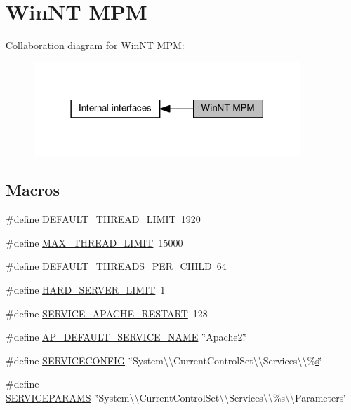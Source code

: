 \hypertarget{group__APACHE__MPM__WINNT}{}\section{Win\+NT M\+PM}
\label{group__APACHE__MPM__WINNT}
Collaboration diagram for Win\+NT M\+PM\+:
\nopagebreak
\begin{figure}[H]
\begin{center}
\leavevmode
\includegraphics[width=285pt]{group__APACHE__MPM__WINNT}
\end{center}
\end{figure}
\subsection*{Macros}
\begin{DoxyCompactItemize}
\item 
\#define \hyperlink{group__APACHE__MPM__WINNT_ga62328ee393d1f137bcb50e99ce25071d}{D\+E\+F\+A\+U\+L\+T\+\_\+\+T\+H\+R\+E\+A\+D\+\_\+\+L\+I\+M\+IT}~1920
\item 
\#define \hyperlink{group__APACHE__MPM__WINNT_ga99c6a4eb6eca28f6a07513dfa7aabf55}{M\+A\+X\+\_\+\+T\+H\+R\+E\+A\+D\+\_\+\+L\+I\+M\+IT}~15000
\item 
\#define \hyperlink{group__APACHE__MPM__WINNT_gaf3e2d0fe4c45aac538a61bf99d69a378}{D\+E\+F\+A\+U\+L\+T\+\_\+\+T\+H\+R\+E\+A\+D\+S\+\_\+\+P\+E\+R\+\_\+\+C\+H\+I\+LD}~64
\item 
\#define \hyperlink{group__APACHE__MPM__WINNT_ga285760d54e8e9036c955fe4952e0b9e4}{H\+A\+R\+D\+\_\+\+S\+E\+R\+V\+E\+R\+\_\+\+L\+I\+M\+IT}~1
\item 
\#define \hyperlink{group__APACHE__MPM__WINNT_ga9728584c8a48e10efacaf29f5899f587}{S\+E\+R\+V\+I\+C\+E\+\_\+\+A\+P\+A\+C\+H\+E\+\_\+\+R\+E\+S\+T\+A\+RT}~128
\item 
\#define \hyperlink{group__APACHE__MPM__WINNT_gad0beaba9b85830b80598161ccf25f3dd}{A\+P\+\_\+\+D\+E\+F\+A\+U\+L\+T\+\_\+\+S\+E\+R\+V\+I\+C\+E\+\_\+\+N\+A\+ME}~\char`\"{}Apache2.\char`\"{}
\item 
\#define \hyperlink{group__APACHE__MPM__WINNT_ga81acdaeaf223bad3c6a576204e9a1836}{S\+E\+R\+V\+I\+C\+E\+C\+O\+N\+F\+IG}~\char`\"{}System\textbackslash{}\textbackslash{}\+Current\+Control\+Set\textbackslash{}\textbackslash{}\+Services\textbackslash{}\textbackslash{}\%\hyperlink{pcretest_8txt_a062597889ba244b72877454b1d3adecf}{s}\char`\"{}
\item 
\#define \hyperlink{group__APACHE__MPM__WINNT_gaa61e8b42448defae941ff4c7740aa052}{S\+E\+R\+V\+I\+C\+E\+P\+A\+R\+A\+MS}~\char`\"{}System\textbackslash{}\textbackslash{}\+Current\+Control\+Set\textbackslash{}\textbackslash{}\+Services\textbackslash{}\textbackslash{}\%s\textbackslash{}\textbackslash{}\+Parameters\char`\"{}
\end{DoxyCompactItemize}

